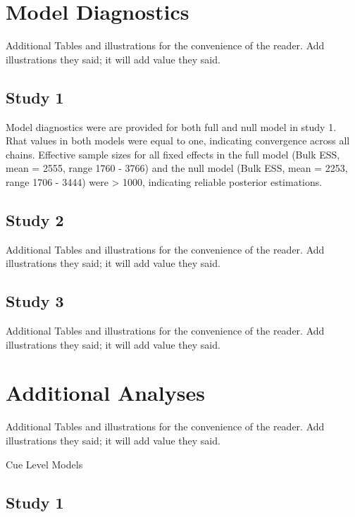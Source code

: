 \documentclass[
  man]{apa6}
\begin{document}
\section{Model Diagnostics}\label{model-diagnostics}

Additional Tables and illustrations for the convenience of the reader. Add illustrations they said; it will add value they said.

\subsection{Study 1}\label{study-1-2}

Model diagnostics were are provided for both full and null model in study 1. Rhat values in both models were equal to one, indicating convergence across all chains. Effective sample sizes for all fixed effects in the full model (Bulk ESS, mean = 2555, range 1760 - 3766) and the null model (Bulk ESS, mean = 2253, range 1706 - 3444) were \textgreater{} 1000, indicating reliable posterior estimations.

\subsection{Study 2}\label{study-2-2}

Additional Tables and illustrations for the convenience of the reader. Add illustrations they said; it will add value they said.

\subsection{Study 3}\label{study-3-2}

Additional Tables and illustrations for the convenience of the reader. Add illustrations they said; it will add value they said.

\section{Additional Analyses}\label{additional-analyses-1}

Additional Tables and illustrations for the convenience of the reader. Add illustrations they said; it will add value they said.

Cue Level Models

\subsection{Study 1}\label{study-1-3}
\end{document}
